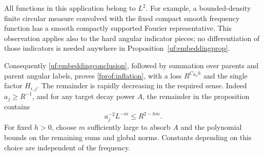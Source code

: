 All functions in this application belong to \(L^2\). For example,
a bounded-density finite circular measure convolved with the fixed
compact smooth frequency function has a smooth compactly supported
Fourier representative. This observation applies also to the hard
angular indicator pieces; no differentiation of those indicators is
needed anywhere in Proposition~\ref{uf:embeddingprop}.

Consequently \eqref{uf:embeddingconclusion}, followed by summation
over parents and parent angular labels, proves
\eqref{fprof:inflation}, with a loss \(R^{C_{K_0}h}\) and the single
factor \(H_{i,j}\). The remainder is rapidly decreasing in the
required sense. Indeed \(a_j\geq R^{-1}\), and for any target
decay power \(A\), the remainder in the proposition contains
$$
 a_j^{-2}L^{-m}\leq R^{2-hm}.
$$
For fixed \(h>0\), choose \(m\) sufficiently large to absorb \(A\)
and the polynomial bounds on the remaining sums and global norms.
Constants depending on this choice are independent of the frequency.
